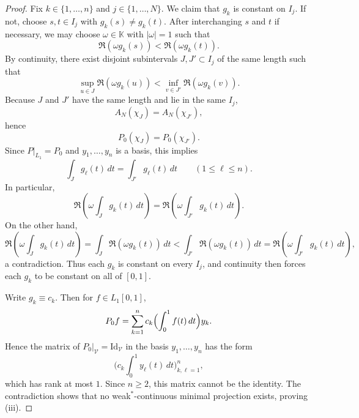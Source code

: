 \documentclass[10pt,a4paper]{amsart}
\newcommand{\Id}{\mathrm{Id}}
\newcommand{\K}{\mathbb K}
\begin{document}
\begin{proof}
Fix $k\in\{1,\dots,n\}$ and $j\in\{1,\dots,N\}$. We claim that $g_k$ is constant on $I_j$. If not, choose $s,t\in I_j$ with $g_k(s)\neq g_k(t)$. After interchanging $s$ and $t$ if necessary, we may choose $\omega\in\K$ with $|\omega|=1$ such that
\[
\Re(\omega g_k(s)) < \Re(\omega g_k(t)).
\]
By continuity, there exist disjoint subintervals $J,J'\subset I_j$ of the same length such that
\[
\sup_{u\in J} \Re(\omega g_k(u)) < \inf_{v\in J'} \Re(\omega g_k(v)).
\]
Because $J$ and $J'$ have the same length and lie in the same $I_j$,
\[
A_N(\chi_J)=A_N(\chi_{J'}),
\]
hence
\[
P_0(\chi_J)=P_0(\chi_{J'}).
\]
Since $P|_{L_1}=P_0$ and $y_1,\dots,y_n$ is a basis, this implies
\[
\int_J g_\ell(t)\,dt = \int_{J'} g_\ell(t)\,dt
\qquad (1\leqslant \ell\leqslant n).
\]
In particular,
\[
\Re\left(\omega\int_J g_k(t)\,dt\right)
=
\Re\left(\omega\int_{J'} g_k(t)\,dt\right).
\]
On the other hand,
\[
\Re\left(\omega\int_J g_k(t)\,dt\right)
=
\int_J \Re(\omega g_k(t))\,dt
<
\int_{J'} \Re(\omega g_k(t))\,dt
=
\Re\left(\omega\int_{J'} g_k(t)\,dt\right),
\]
a contradiction. Thus each $g_k$ is constant on every $I_j$, and continuity then forces each $g_k$ to be constant on all of $[0,1]$.

Write $g_k\equiv c_k$. Then for $f\in L_1[0,1]$,
\[
P_0f = \sum_{k=1}^n c_k\Bigl(\int_0^1 f(t)\,dt\Bigr) y_k.
\]
Hence the matrix of $P_0|_{\mathscr V}=\Id_{\mathscr V}$ in the basis $y_1,\dots,y_n$ has the form
\[
\bigl(c_k\!\int_0^1 y_\ell(t)\,dt\bigr)_{k,\ell=1}^n,
\]
which has rank at most $1$. Since $n\geqslant 2$, this matrix cannot be the identity. The contradiction shows that no weak$^*$-continuous minimal projection exists, proving \textup{(iii)}.
\end{proof}
\end{document}
